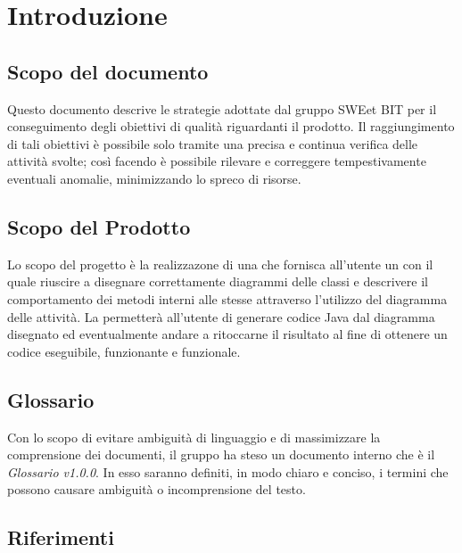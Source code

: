 \section{Introduzione}
  \subsection{Scopo del documento}
          Questo documento descrive le strategie adottate dal gruppo SWEet BIT per il conseguimento degli obiettivi di qualità riguardanti il prodotto.
          Il raggiungimento di tali obiettivi è possibile solo tramite una precisa e continua verifica delle attività svolte; così facendo è possibile
          rilevare e correggere tempestivamente eventuali anomalie, minimizzando lo spreco di risorse.
  \subsection{Scopo del Prodotto}
          Lo scopo del progetto è la realizzazone di una  che fornisca all'utente un   con il quale riuscire a disegnare correttamente diagrammi delle classi
          e descrivere il comportamento dei metodi interni alle stesse attraverso l'utilizzo del diagramma delle attività.
          La  permetterà all'utente di generare codice Java dal diagramma disegnato ed eventualmente andare a ritoccarne il risultato al fine di ottenere un codice
          eseguibile, funzionante e funzionale.
  \subsection{Glossario}
          Con lo scopo di evitare ambiguità di linguaggio e di massimizzare la comprensione dei documenti, il
          gruppo ha steso un documento interno che è il \emph{Glossario v1.0.0}. In esso saranno definiti, in modo
          chiaro e conciso, i termini che possono causare ambiguità o incomprensione del testo.
  \subsection{Riferimenti}
